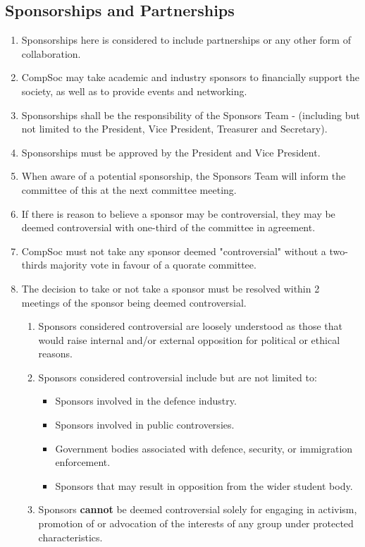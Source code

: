\subsection{Sponsorships and Partnerships}
\begin{enumerate}
    \item Sponsorships here is considered to include partnerships or any other form of collaboration.
    \item CompSoc may take academic and industry sponsors to financially support the society, as well as to provide events and networking.
    \item Sponsorships shall be the responsibility of the Sponsors Team - (including but not limited to the President, Vice President, Treasurer and Secretary).
    \item Sponsorships must be approved by the President and Vice President.
    \item When aware of a potential sponsorship, the Sponsors Team will inform the committee of this at the next committee meeting.
    \item If there is reason to believe a sponsor may be controversial, they may be deemed controversial with one-third of the committee in agreement.
    \item CompSoc must not take any sponsor deemed "controversial" without a two-thirds majority vote in favour of a quorate committee.
    \item The decision to take or not take a sponsor must be resolved within 2 meetings of the sponsor being deemed controversial.
    \begin{enumerate}
        \item Sponsors considered controversial are loosely understood as those that would raise internal and/or external opposition for political or ethical reasons.
        \item Sponsors considered controversial include but are not limited to:
        \begin{itemize}
            \item Sponsors involved in the defence industry.
            \item Sponsors involved in public controversies.
            \item Government bodies associated with defence, security, or immigration enforcement.
            \item Sponsors that may result in opposition from the wider student body.
        \end{itemize}
        \item Sponsors \textbf{cannot} be deemed controversial solely for engaging in activism, promotion of or advocation of the interests of any group under protected characteristics.

\end{enumerate}
\end{enumerate}
